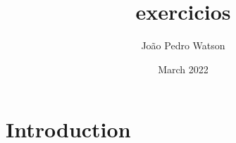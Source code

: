 \documentclass{article}[12pt, A4]
\title{exercicios}
\author{João Pedro Watson}
\date{March 2022}
\begin{document}
\maketitle
\section{Introduction}



\newpage

\end{document}
